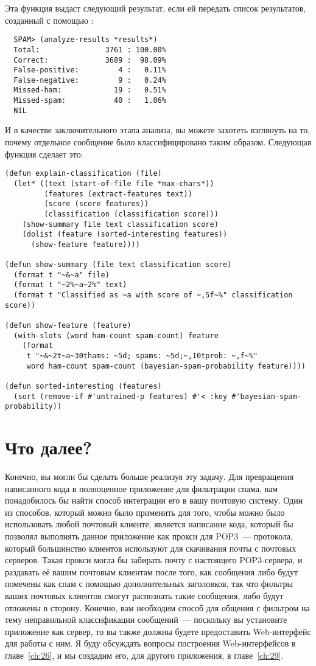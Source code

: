 Эта функция выдаст следующий результат, если ей передать список результатов, созданный с
помощью :

\begin{verbatim}
  SPAM> (analyze-results *results*)
  Total:               3761 : 100.00%
  Correct:             3689 :  98.09%
  False-positive:         4 :   0.11%
  False-negative:         9 :   0.24%
  Missed-ham:            19 :   0.51%
  Missed-spam:           40 :   1.06%
  NIL
\end{verbatim}

И в качестве заключительного этапа анализа, вы можете захотеть взглянуть на то, почему
отдельное сообщение было классифицировано таким образом.  Следующая функция сделает это:

\begin{lstlisting}
(defun explain-classification (file)
  (let* ((text (start-of-file file *max-chars*))
         (features (extract-features text))
         (score (score features))
         (classification (classification score)))
    (show-summary file text classification score)
    (dolist (feature (sorted-interesting features))
      (show-feature feature))))

(defun show-summary (file text classification score)
  (format t "~&~a" file)
  (format t "~2%~a~2%" text)
  (format t "Classified as ~a with score of ~,5f~%" classification score))

(defun show-feature (feature)
  (with-slots (word ham-count spam-count) feature
    (format
     t "~&~2t~a~30thams: ~5d; spams: ~5d;~,10tprob: ~,f~%"
     word ham-count spam-count (bayesian-spam-probability feature))))

(defun sorted-interesting (features)
  (sort (remove-if #'untrained-p features) #'< :key #'bayesian-spam-probability))
\end{lstlisting}

\section{Что далее?}

Конечно, вы могли бы сделать больше реализуя эту задачу.  Для превращения написанного кода
в полноценное приложение для фильтрации спама, вам понадобилось бы найти способ интеграции
его в вашу почтовую систему.  Один из способов, который можно было применить для того,
чтобы можно было использовать любой почтовый клиенте, является написание кода, который бы
позволял выполнять данное приложение как прокси для POP3~--- протокола, который
большинство клиентов используют для скачивания почты с почтовых серверов.  Такая прокси
могла бы забирать почту с настоящего POP3-сервера, и раздавать её вашим почтовым клиентам
после того, как сообщения либо будут помечены как спам с помощью дополнительных
заголовков, так что фильтры ваших почтовых клиентов смогут распознать такие сообщения,
либо будут отложены в сторону.  Конечно, вам необходим способ для общения с фильтром на
тему неправильной классификации сообщений~--- поскольку вы установите приложение как
сервер, то вы также должны будете предоставить Web-интерфейс для работы с ним.  Я буду
обсуждать вопросы построения Web-интерфейсов в главе~\ref{ch:26}, и мы создадим его, для
другого приложения, в главе~\ref{ch:29}.

